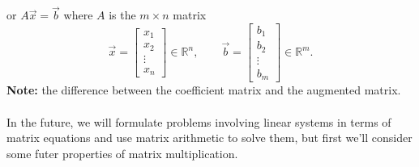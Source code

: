 \documentclass{report}
\begin{document}
or $ A \vec{ x} = \vec{ b} $ where $ A$ is the $ m \times  n $ matrix 
\[
\vec{ x} = \begin{bmatrix}
  x_1 \\[2pt]
  x_2 \\[2pt]
  \vdots \\[2pt]
  x_n
\end{bmatrix} \in \mathbb{R} ^{n} , \qquad  \vec{ b} = \begin{bmatrix}
  b_1 \\[2pt]
  b_2 \\[2pt]
  \vdots \\[2pt]
  b_m
\end{bmatrix} \in \mathbb{R} ^{m}
.\] 
\textbf{Note:} the difference between the coefficient matrix and the augmented matrix.\\
\\
In the future, we will formulate problems involving linear systems in terms of matrix equations and use matrix arithmetic to solve them, but first we'll consider some futer properties of matrix multiplication.\\
\end{document}
